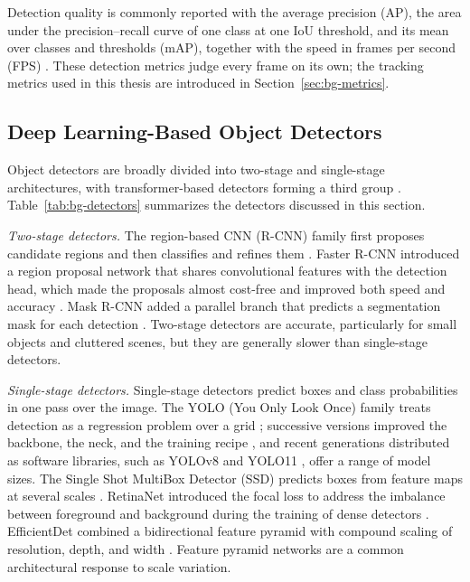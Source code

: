 Detection quality is commonly reported with the average precision (AP), the area under the precision--recall curve of one class at one IoU threshold, and its mean over classes and thresholds (mAP), together with the speed in frames per second (FPS) \cite{lin2014coco,ismail2026realtime}. These detection metrics judge every frame on its own; the tracking metrics used in this thesis are introduced in Section~\ref{sec:bg-metrics}.

\subsection{Deep Learning-Based Object Detectors}\label{sec:bg-detectors}
Object detectors are broadly divided into two-stage and single-stage architectures, with transformer-based detectors forming a third group \cite{ismail2026realtime}. Table~\ref{tab:bg-detectors} summarizes the detectors discussed in this section.

\emph{Two-stage detectors.} The region-based CNN (R-CNN) family first proposes candidate regions and then classifies and refines them \cite{girshick2014rcnn}. Faster R-CNN introduced a region proposal network that shares convolutional features with the detection head, which made the proposals almost cost-free and improved both speed and accuracy \cite{ren2017fasterrcnn}. Mask R-CNN added a parallel branch that predicts a segmentation mask for each detection \cite{he2017maskrcnn}. Two-stage detectors are accurate, particularly for small objects and cluttered scenes, but they are generally slower than single-stage detectors.

\emph{Single-stage detectors.} Single-stage detectors predict boxes and class probabilities in one pass over the image. The YOLO (You Only Look Once) family treats detection as a regression problem over a grid \cite{redmon2016yolo}; successive versions improved the backbone, the neck, and the training recipe \cite{redmon2018yolov3,bochkovskiy2020yolov4,ge2021yolox,wang2024yolov9}, and recent generations distributed as software libraries, such as YOLOv8 \cite{jocher2023yolov8} and YOLO11 \cite{jocher2024yolo11}, offer a range of model sizes. The Single Shot MultiBox Detector (SSD) predicts boxes from feature maps at several scales \cite{liu2016ssd}. RetinaNet introduced the focal loss to address the imbalance between foreground and background during the training of dense detectors \cite{lin2017focal}. EfficientDet combined a bidirectional feature pyramid with compound scaling of resolution, depth, and width \cite{tan2020efficientdet}. Feature pyramid networks \cite{lin2017fpn} are a common architectural response to scale variation.


